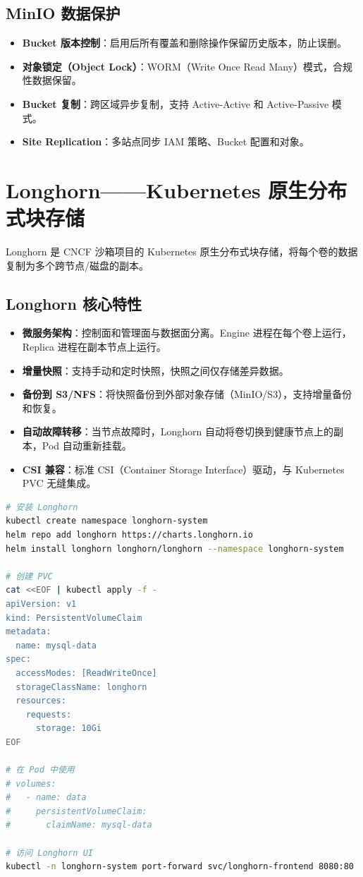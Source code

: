 \documentclass[12pt,UTF8]{ctexbook}
\begin{document}
\subsection{MinIO 数据保护}

\begin{itemize}
    \item \textbf{Bucket 版本控制}：启用后所有覆盖和删除操作保留历史版本，防止误删。
    \item \textbf{对象锁定（Object Lock）}：WORM（Write Once Read Many）模式，合规性数据保留。
    \item \textbf{Bucket 复制}：跨区域异步复制，支持 Active-Active 和 Active-Passive 模式。
    \item \textbf{Site Replication}：多站点同步 IAM 策略、Bucket 配置和对象。
\end{itemize}

\section{Longhorn——Kubernetes 原生分布式块存储}
\label{sec:longhorn}

Longhorn 是 CNCF 沙箱项目的 Kubernetes 原生分布式块存储，将每个卷的数据复制为多个跨节点/磁盘的副本。

\subsection{Longhorn 核心特性}

\begin{itemize}
    \item \textbf{微服务架构}：控制面和管理面与数据面分离。Engine 进程在每个卷上运行，Replica 进程在副本节点上运行。
    \item \textbf{增量快照}：支持手动和定时快照，快照之间仅存储差异数据。
    \item \textbf{备份到 S3/NFS}：将快照备份到外部对象存储（MinIO/S3），支持增量备份和恢复。
    \item \textbf{自动故障转移}：当节点故障时，Longhorn 自动将卷切换到健康节点上的副本，Pod 自动重新挂载。
    \item \textbf{CSI 兼容}：标准 CSI（Container Storage Interface）驱动，与 Kubernetes PVC 无缝集成。
\end{itemize}

\begin{lstlisting}[language=bash]
# 安装 Longhorn
kubectl create namespace longhorn-system
helm repo add longhorn https://charts.longhorn.io
helm install longhorn longhorn/longhorn --namespace longhorn-system

# 创建 PVC
cat <<EOF | kubectl apply -f -
apiVersion: v1
kind: PersistentVolumeClaim
metadata:
  name: mysql-data
spec:
  accessModes: [ReadWriteOnce]
  storageClassName: longhorn
  resources:
    requests:
      storage: 10Gi
EOF

# 在 Pod 中使用
# volumes:
#   - name: data
#     persistentVolumeClaim:
#       claimName: mysql-data

# 访问 Longhorn UI
kubectl -n longhorn-system port-forward svc/longhorn-frontend 8080:80
\end{lstlisting}
\end{document}
